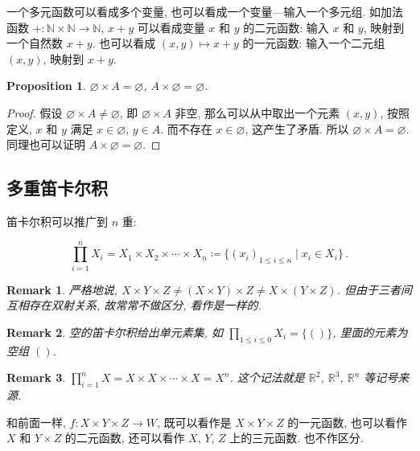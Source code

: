 \documentclass[UTF8]{ctexart}
\theoremstyle{mystyle}
\newtheorem{proposition}{Proposition}[section]
\theoremstyle{myremark}
\newtheorem*{remark}{Remark}
\theoremstyle{plain}
\newcommand{\R}{\mathbb R}
\newcommand{\N}{\mathbb N}
\newcommand{\set}[1]{\{#1\}}
\begin{document}
一个多元函数可以看成多个变量, 也可以看成一个变量---输入一个多元组. 如加法函数 $ + \colon \N \times \N \to \N $, $ x + y $ 可以看成变量 $ x $ 和 $ y $ 的二元函数: 输入 $ x $ 和 $ y $, 映射到一个自然数 $ x + y $. 也可以看成 $ (x, y) \mapsto x + y $ 的一元函数: 输入一个二元组 $ (x, y) $, 映射到 $ x + y $.

\begin{proposition}
    $ \varnothing \times A = \varnothing $, $ A \times \varnothing = \varnothing $.
\end{proposition}

\begin{proof}
    假设 $ \varnothing \times A \neq \varnothing $, 即 $ \varnothing \times A $ 非空, 那么可以从中取出一个元素 $ (x, y) $, 按照定义, $ x $ 和 $ y $ 满足 $ x \in \varnothing $, $ y \in A $. 而不存在 $ x \in \varnothing $, 这产生了矛盾. 所以 $ \varnothing \times A = \varnothing $. 同理也可以证明 $ A \times \varnothing = \varnothing $.
\end{proof}


\subsection{多重笛卡尔积}
笛卡尔积可以推广到 $ n $ 重:
\begin{definition}
    \[ \prod_{i = 1}^n X_i = X_1 \times X_2 \times \cdots \times X_n \coloneqq \set{(x_i)_{1 \leqslant i \leqslant n} \mid x_i \in X_i } \,.\]
\end{definition}

\begin{remark}
    严格地说, $ X \times Y \times Z \neq (X \times Y) \times Z \neq X \times (Y \times Z) $. 但由于三者间互相存在双射关系, 故常常不做区分, 看作是一样的.
\end{remark}

\begin{remark}
    空的笛卡尔积给出单元素集, 如 $ \prod_{1 \leqslant i \leqslant 0} X_i = \set{()} $, 里面的元素为空组 $ () $. 
\end{remark}

\begin{remark}
    $ \prod_{i = 1}^n X = X \times X \times \cdots \times X = X^n $. 这个记法就是 $ \R^2 $, $ \R^3 $, $ \R^n $ 等记号来源.
\end{remark}

和前面一样, $ f \colon X \times Y \times Z \to W $, 既可以看作是 $ X \times Y \times Z $ 的一元函数, 也可以看作 $ X $ 和 $ Y \times Z $ 的二元函数, 还可以看作 $ X $, $ Y $, $ Z $ 上的三元函数. 也不作区分.
\end{document}
